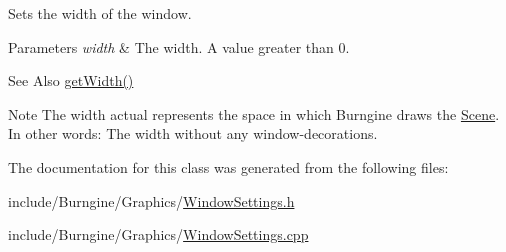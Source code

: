 Sets the width of the window. 


\begin{DoxyParams}{Parameters}
{\em width} & The width. A value greater than 0.\\
\hline
\end{DoxyParams}
\begin{DoxySeeAlso}{See Also}
\hyperlink{classburn_1_1_window_settings_a52ab177b1d13ce1a3623f093d0a59b96}{get\-Width()}
\end{DoxySeeAlso}
\begin{DoxyNote}{Note}
The width actual represents the space in which Burngine draws the \hyperlink{classburn_1_1_scene}{Scene}. In other words\-: The width without any window-\/decorations. 
\end{DoxyNote}


The documentation for this class was generated from the following files\-:\begin{DoxyCompactItemize}
\item 
include/\-Burngine/\-Graphics/\hyperlink{_window_settings_8h}{Window\-Settings.\-h}\item 
include/\-Burngine/\-Graphics/\hyperlink{_window_settings_8cpp}{Window\-Settings.\-cpp}\end{DoxyCompactItemize}
